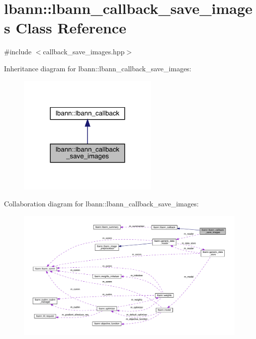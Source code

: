 \hypertarget{classlbann_1_1lbann__callback__save__images}{}\section{lbann\+:\+:lbann\+\_\+callback\+\_\+save\+\_\+images Class Reference}
\label{classlbann_1_1lbann__callback__save__images}


{\ttfamily \#include $<$callback\+\_\+save\+\_\+images.\+hpp$>$}



Inheritance diagram for lbann\+:\+:lbann\+\_\+callback\+\_\+save\+\_\+images\+:\nopagebreak
\begin{figure}[H]
\begin{center}
\leavevmode
\includegraphics[width=192pt]{classlbann_1_1lbann__callback__save__images__inherit__graph}
\end{center}
\end{figure}


Collaboration diagram for lbann\+:\+:lbann\+\_\+callback\+\_\+save\+\_\+images\+:\nopagebreak
\begin{figure}[H]
\begin{center}
\leavevmode
\includegraphics[width=350pt]{classlbann_1_1lbann__callback__save__images__coll__graph}
\end{center}
\end{figure}
